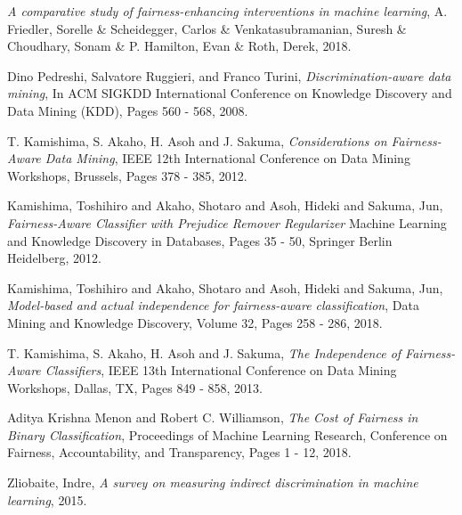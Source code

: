 \documentclass[a4paper, 12pt, titlepage]{article}
\begin{document}
\begin{thebibliography}{10}

  
  \textit{A comparative study of fairness-enhancing interventions in machine learning},
  A. Friedler, Sorelle \& Scheidegger, Carlos \& Venkatasubramanian, Suresh \& Choudhary, Sonam \& P. Hamilton, Evan \& Roth, Derek,
  2018. 
  
  Dino Pedreshi, Salvatore Ruggieri, and Franco Turini,
  \textit{Discrimination-aware data mining},
  In ACM SIGKDD International Conference on Knowledge Discovery and Data Mining (KDD),
  Pages 560 - 568, 
  2008.

  T. Kamishima, S. Akaho, H. Asoh and J. Sakuma,
  \textit{Considerations on Fairness-Aware Data Mining},
  IEEE 12th International Conference on Data Mining Workshops, Brussels,
  Pages 378 - 385,
  2012.

  Kamishima, Toshihiro and Akaho, Shotaro and Asoh, Hideki and Sakuma, Jun,
  \textit{Fairness-Aware Classifier with Prejudice Remover Regularizer}
  Machine Learning and Knowledge Discovery in Databases,
  Pages 35 - 50,
  Springer Berlin Heidelberg,
  2012.

  Kamishima, Toshihiro and Akaho, Shotaro and Asoh, Hideki and Sakuma, Jun,
  \textit{Model-based and actual independence for fairness-aware classification},
  Data Mining and Knowledge Discovery,
  Volume 32,
  Pages 258 - 286,
  2018.

  T. Kamishima, S. Akaho, H. Asoh and J. Sakuma, 
  \textit{The Independence of Fairness-Aware Classifiers},
  IEEE 13th International Conference on Data Mining Workshops, Dallas, TX,
  Pages 849 - 858,
  2013.

  Aditya Krishna Menon and Robert C. Williamson,
  \textit{The Cost of Fairness in Binary Classification},
  Proceedings of Machine Learning Research,
  Conference on Fairness, Accountability, and Transparency,
  Pages 1 - 12,
  2018.

  Zliobaite, Indre,
  \textit{A survey on measuring indirect discrimination in machine learning}, 
  2015. 

\end{thebibliography}
\end{document}
